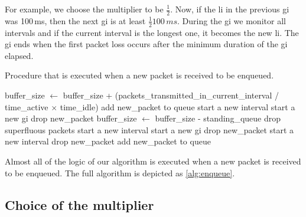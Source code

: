 \documentclass[10pt,sigconf,letterpaper,dvipsnames\ifx\removeHeaders\tempYes ,nonacm\fi]{acmart}
\begin{document}
For example, we choose the multiplier to be $\frac{1}{2}$. Now, if the \gls{li} in the previous \gls{gi} was 100\,ms, then the next \gls{gi} is at least $\frac{1}{2} 100\,ms$. During the \gls{gi} we monitor all intervals and if the current interval is the longest one, it becomes the new \gls{li}. The \gls{gi} ends when the first packet loss occurs after the minimum duration of the \gls{gi} elapsed. 

\begin{algorithm}[h]
\caption{Procedure that is executed when a new packet is received to be enqueued.}
\label{alg:enqueue}
\begin{algorithmic}[1]%
			\State buffer\_size $\gets$ buffer\_size + (packets\_transmitted\_in\_current\_interval / time\_active $\times$ time\_idle)
			\State add new\_packet to queue
			\State start a new interval
			\State start a new \gls{gi}
			\State drop new\_packet
				\State buffer\_size $\gets$ buffer\_size - standing\_queue
				\State drop superfluous packets
			\EndIf
			\State start a new interval
			\State start a new \gls{gi}
			\State drop new\_packet
		\Else
			\State start a new interval
			\State drop new\_packet
		\EndIf
	\Else
		\State add new\_packet to queue
	\EndIf
\EndFunction
\end{algorithmic}
\end{algorithm}
Almost all of the logic of our algorithm is executed when a new packet is received to be enqueued. The full algorithm is depicted as \autoref{alg:enqueue}.

\subsection{Choice of the multiplier}
\end{document}
